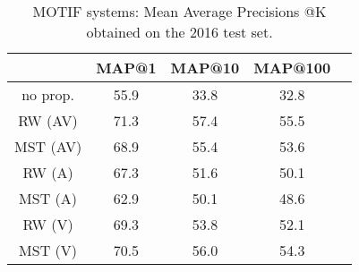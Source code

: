 \begin{table}[!t]
\caption{MOTIF systems: Mean Average Precisions @K obtained on the 2016 test set.}

\label{tab:MOTIF_perfs}
\centering
\begin{tabular}{|c||c|c|c|c|}
\hline
           & MAP@1& MAP@10& MAP@100  \\ \hline
\hline
\hline
no prop.   & 55.9 &  33.8 & 32.8\\ \hline
\hline
RW (AV)    & 71.3 &  57.4 & 55.5\\ \hline
MST (AV)   & 68.9 &  55.4 & 53.6\\ \hline
\hline
RW (A)     & 67.3 &  51.6 & 50.1\\ \hline
MST (A)    & 62.9 &  50.1 & 48.6 \\ \hline
\hline
RW (V)     & 69.3  & 53.8 & 52.1 \\ \hline
MST (V)    & 70.5  & 56.0 & 54.3 \\ \hline


\end{tabular}
\end{table}

\endinput
